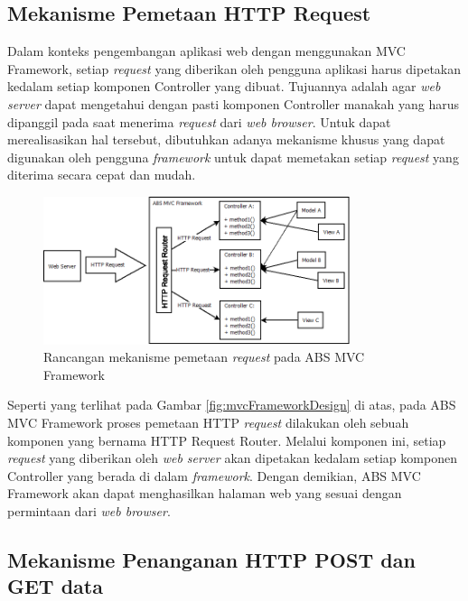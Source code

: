 \subsection{Mekanisme Pemetaan HTTP Request}

Dalam konteks pengembangan aplikasi web dengan menggunakan MVC Framework, setiap \textit{request} yang diberikan oleh pengguna aplikasi harus dipetakan kedalam setiap komponen Controller yang dibuat. Tujuannya adalah agar \textit{web server} dapat mengetahui dengan pasti komponen Controller manakah yang harus dipanggil pada saat menerima \textit{request} dari \textit{web browser}. Untuk dapat merealisasikan hal tersebut, dibutuhkan adanya mekanisme khusus yang dapat digunakan oleh pengguna \textit{framework} untuk dapat memetakan setiap \textit{request} yang diterima secara cepat dan mudah.

\begin{figure}
    \centering
    \includegraphics[width=0.8\textwidth]{img/mvc-routing-mechanism}
    \caption{Rancangan mekanisme pemetaan \textit{request} pada ABS MVC Framework}
    \label{fig:mvcRoutingMechanism}
\end{figure}

Seperti yang terlihat pada Gambar \ref{fig:mvcFrameworkDesign} di atas, pada ABS MVC Framework proses pemetaan HTTP \textit{request} dilakukan oleh sebuah komponen yang bernama HTTP Request Router. Melalui komponen ini, setiap \textit{request} yang diberikan oleh \textit{web server} akan dipetakan kedalam setiap komponen Controller yang berada di dalam \textit{framework}. Dengan demikian, ABS MVC Framework akan dapat menghasilkan halaman web yang sesuai dengan permintaan dari \textit{web browser}.

\subsection{Mekanisme Penanganan HTTP POST dan GET data}

